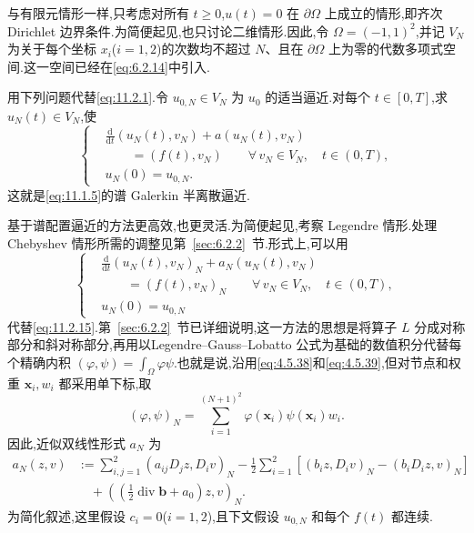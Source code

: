 与有限元情形一样,只考虑对所有 \(t\ge0\),\(u(t)=0\) 在 \(\partial\Omega\) 上成立的情形,即齐次 Dirichlet 边界条件.为简便起见,也只讨论二维情形.因此,令 \(\Omega=(-1,1)^2\),并记 \(V_N\) 为关于每个坐标 \(x_i\)(\(i=1,2\))的次数均不超过 \(N\)、且在 \(\partial\Omega\) 上为零的代数多项式空间.这一空间已经在\eqref{eq:6.2.14}中引入.

用下列问题代替\eqref{eq:11.2.1}.令 \(u_{0,N}\in V_N\) 为 \(u_0\) 的适当逼近.对每个 \(t\in[0,T]\),求 \(u_N(t)\in V_N\),使
\begin{equation}\label{eq:11.2.15}
  \left\{
  \begin{aligned}
    &\frac{\mathrm d}{\mathrm dt}(u_N(t),v_N)+a(u_N(t),v_N)\\
    &\qquad=(f(t),v_N)\qquad\forall\,v_N\in V_N,\quad t\in(0,T),\\
    &u_N(0)=u_{0,N}.
  \end{aligned}
  \right.
\end{equation}
这就是\eqref{eq:11.1.5}的谱 Galerkin 半离散逼近.

基于谱配置逼近的方法更高效,也更灵活.为简便起见,考察 Legendre 情形.处理 Chebyshev 情形所需的调整见第~\ref{sec:6.2.2}~节.形式上,可以用
\begin{equation}\label{eq:11.2.16}
  \left\{
  \begin{aligned}
    &\frac{\mathrm d}{\mathrm dt}(u_N(t),v_N)_N+a_N(u_N(t),v_N)\\
    &\qquad=(f(t),v_N)_N\qquad\forall\,v_N\in V_N,\quad t\in(0,T),\\
    &u_N(0)=u_{0,N}
  \end{aligned}
  \right.
\end{equation}
代替\eqref{eq:11.2.15}.第~\ref{sec:6.2.2}~节已详细说明,这一方法的思想是将算子 \(L\) 分成对称部分和斜对称部分,再用以Legendre--Gauss--Lobatto 公式为基础的数值积分代替每个精确内积 \((\varphi,\psi)=\int_\Omega\varphi\psi\).也就是说,沿用\eqref{eq:4.5.38}和\eqref{eq:4.5.39},但对节点和权重 \(\boldsymbol{x}_i,w_i\) 都采用单下标,取
\[
  (\varphi,\psi)_N=\sum_{i=1}^{(N+1)^2}\varphi(\boldsymbol{x}_i)\psi(\boldsymbol{x}_i)w_i.
\]
因此,近似双线性形式 \(a_N\) 为
\[
  \begin{aligned}
    a_N(z,v)&:=\sum_{i,j=1}^2(a_{ij}D_jz,D_iv)_N
        -\frac12\sum_{i=1}^2[(b_i z,D_i v)_N-(b_iD_i z,v)_N]\\
        &\quad+\left(\left(\tfrac12\operatorname{div}\boldsymbol{b}+a_0\right)z,v\right)_N.
  \end{aligned}
\]
为简化叙述,这里假设 \(c_i=0\)(\(i=1,2\)),且下文假设 \(u_{0,N}\) 和每个 \(f(t)\) 都连续.

